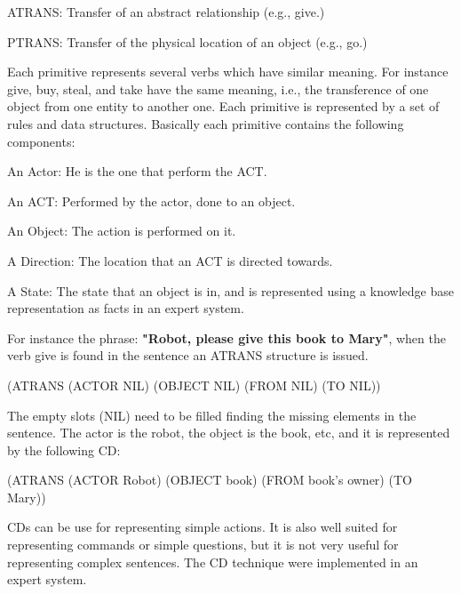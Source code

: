\documentclass{llncs}
\begin{document}
\vspace{.01 in}
		ATRANS: Transfer of an abstract relationship (e.g., give.)

\vspace{.01 in}
		PTRANS: Transfer of the physical location of an object (e.g., go.)
\vspace{.01 in}

Each primitive represents several verbs which have similar meaning. For instance give, buy, steal, and take have the same meaning, i.e., the transference of one object from one entity to another one.
Each primitive is represented by a set of rules and data structures. Basically each primitive contains the following components:
\vspace{.01 in}

	An Actor: He is the one that perform the ACT.
\vspace{.01 in}

	An ACT: Performed by the actor, done to an object.
\vspace{.01 in}

	An Object: The action is performed on it.
\vspace{.01 in}

	A Direction: The location that an ACT is directed towards.
\vspace{.01 in}

	A State: The state that an object is in, and is represented using a knowledge base representation as
facts in an expert system. 
\vspace{.01 in}

	For instance the phrase: {\bf "Robot, please give this book to Mary"}, 
when the verb give is found in the sentence an ATRANS structure is issued.
\vspace{.01 in}

	(ATRANS (ACTOR NIL) (OBJECT NIL) (FROM NIL) (TO NIL))
\vspace{.01 in}

The empty slots (NIL) need to be filled finding the missing elements in the sentence. The actor is the robot, the 
object is the book, etc, and it is represented by the following CD:
\vspace{.01 in}

	(ATRANS (ACTOR Robot) (OBJECT book) (FROM book's owner) (TO Mary))
\vspace{.01 in}


CDs can be use for representing simple actions. It is also well suited for representing commands or simple questions, but it is not very useful for representing complex sentences.
The CD technique were implemented in an expert system.
\end{document}
